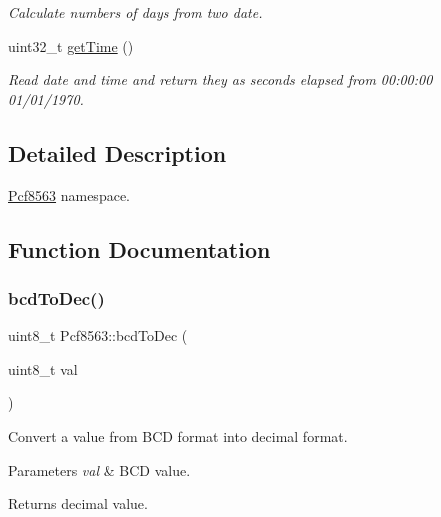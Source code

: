 \begin{DoxyCompactItemize}
\begin{DoxyCompactList}\small\item\em Calculate numbers of days from two date. \end{DoxyCompactList}\item 
uint32\+\_\+t \hyperlink{namespacePcf8563_a2824a08aaed53b49a8fc1aa77cab629d}{get\+Time} ()
\begin{DoxyCompactList}\small\item\em Read date and time and return they as seconds elapsed from 00\+:00\+:00 01/01/1970. \end{DoxyCompactList}\end{DoxyCompactItemize}


\subsection{Detailed Description}
\hyperlink{namespacePcf8563}{Pcf8563} namespace. 

\subsection{Function Documentation}
\mbox{\label{namespacePcf8563_aae506e83df33a718bdd0dd184d42c19a}} 
\subsubsection{\texorpdfstring{bcd\+To\+Dec()}{bcdToDec()}}
{\footnotesize\ttfamily uint8\+\_\+t Pcf8563\+::bcd\+To\+Dec (\begin{DoxyParamCaption}\item[{uint8\+\_\+t}]{val }\end{DoxyParamCaption})}



Convert a value from B\+CD format into decimal format. 


\begin{DoxyParams}{Parameters}
{\em val} & B\+CD value. \\
\hline
\end{DoxyParams}
\begin{DoxyReturn}{Returns}
decimal value. 
\end{DoxyReturn}
\mbox{\label{namespacePcf8563_a3519616ff3c2de84e2ea54442ef0ed0c}} 
